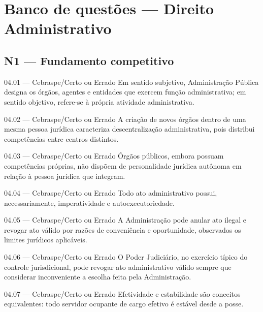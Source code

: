 \section{Banco de questões — Direito Administrativo}

\subsection*{N1 — Fundamento competitivo}

\begin{questao}{ 04.01 — Cebraspe/Certo ou Errado}
Em sentido subjetivo, Administração Pública designa os órgãos, agentes e entidades que exercem função administrativa; em sentido objetivo, refere-se à própria atividade administrativa.
\end{questao}

\begin{questao}{ 04.02 — Cebraspe/Certo ou Errado}
A criação de novos órgãos dentro de uma mesma pessoa jurídica caracteriza descentralização administrativa, pois distribui competências entre centros distintos.
\end{questao}

\begin{questao}{ 04.03 — Cebraspe/Certo ou Errado}
Órgãos públicos, embora possuam competências próprias, não dispõem de personalidade jurídica autônoma em relação à pessoa jurídica que integram.
\end{questao}

\begin{questao}{ 04.04 — Cebraspe/Certo ou Errado}
Todo ato administrativo possui, necessariamente, imperatividade e autoexecutoriedade.
\end{questao}

\begin{questao}{ 04.05 — Cebraspe/Certo ou Errado}
A Administração pode anular ato ilegal e revogar ato válido por razões de conveniência e oportunidade, observados os limites jurídicos aplicáveis.
\end{questao}

\begin{questao}{ 04.06 — Cebraspe/Certo ou Errado}
O Poder Judiciário, no exercício típico do controle jurisdicional, pode revogar ato administrativo válido sempre que considerar inconveniente a escolha feita pela Administração.
\end{questao}

\begin{questao}{ 04.07 — Cebraspe/Certo ou Errado}
Efetividade e estabilidade são conceitos equivalentes: todo servidor ocupante de cargo efetivo é estável desde a posse.
\end{questao}


